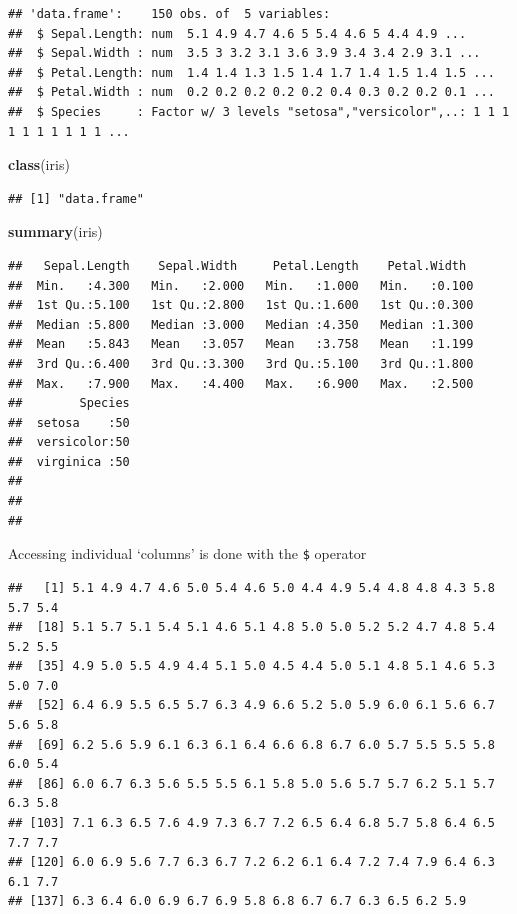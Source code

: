 \documentclass[]{book}
\newenvironment{Shaded}{\begin{snugshade}}{\end{snugshade}}
\newcommand{\KeywordTok}[1]{\textcolor[rgb]{0.13,0.29,0.53}{\textbf{#1}}}
\newcommand{\OperatorTok}[1]{\textcolor[rgb]{0.81,0.36,0.00}{\textbf{#1}}}
\newcommand{\NormalTok}[1]{#1}
\theoremstyle{definition}
\theoremstyle{definition}
\theoremstyle{definition}
\theoremstyle{remark}
\begin{document}
\begin{verbatim}
## 'data.frame':    150 obs. of  5 variables:
##  $ Sepal.Length: num  5.1 4.9 4.7 4.6 5 5.4 4.6 5 4.4 4.9 ...
##  $ Sepal.Width : num  3.5 3 3.2 3.1 3.6 3.9 3.4 3.4 2.9 3.1 ...
##  $ Petal.Length: num  1.4 1.4 1.3 1.5 1.4 1.7 1.4 1.5 1.4 1.5 ...
##  $ Petal.Width : num  0.2 0.2 0.2 0.2 0.2 0.4 0.3 0.2 0.2 0.1 ...
##  $ Species     : Factor w/ 3 levels "setosa","versicolor",..: 1 1 1 1 1 1 1 1 1 1 ...
\end{verbatim}

\begin{Shaded}
\begin{Highlighting}[]
\KeywordTok{class}\NormalTok{(iris)}
\end{Highlighting}
\end{Shaded}

\begin{verbatim}
## [1] "data.frame"
\end{verbatim}

\begin{Shaded}
\begin{Highlighting}[]
\KeywordTok{summary}\NormalTok{(iris)}
\end{Highlighting}
\end{Shaded}

\begin{verbatim}
##   Sepal.Length    Sepal.Width     Petal.Length    Petal.Width   
##  Min.   :4.300   Min.   :2.000   Min.   :1.000   Min.   :0.100  
##  1st Qu.:5.100   1st Qu.:2.800   1st Qu.:1.600   1st Qu.:0.300  
##  Median :5.800   Median :3.000   Median :4.350   Median :1.300  
##  Mean   :5.843   Mean   :3.057   Mean   :3.758   Mean   :1.199  
##  3rd Qu.:6.400   3rd Qu.:3.300   3rd Qu.:5.100   3rd Qu.:1.800  
##  Max.   :7.900   Max.   :4.400   Max.   :6.900   Max.   :2.500  
##        Species  
##  setosa    :50  
##  versicolor:50  
##  virginica :50  
##                 
##                 
## 
\end{verbatim}

Accessing individual `columns' is done with the \texttt{\$} operator

\begin{Shaded}
\end{Shaded}

\begin{verbatim}
##   [1] 5.1 4.9 4.7 4.6 5.0 5.4 4.6 5.0 4.4 4.9 5.4 4.8 4.8 4.3 5.8 5.7 5.4
##  [18] 5.1 5.7 5.1 5.4 5.1 4.6 5.1 4.8 5.0 5.0 5.2 5.2 4.7 4.8 5.4 5.2 5.5
##  [35] 4.9 5.0 5.5 4.9 4.4 5.1 5.0 4.5 4.4 5.0 5.1 4.8 5.1 4.6 5.3 5.0 7.0
##  [52] 6.4 6.9 5.5 6.5 5.7 6.3 4.9 6.6 5.2 5.0 5.9 6.0 6.1 5.6 6.7 5.6 5.8
##  [69] 6.2 5.6 5.9 6.1 6.3 6.1 6.4 6.6 6.8 6.7 6.0 5.7 5.5 5.5 5.8 6.0 5.4
##  [86] 6.0 6.7 6.3 5.6 5.5 5.5 6.1 5.8 5.0 5.6 5.7 5.7 6.2 5.1 5.7 6.3 5.8
## [103] 7.1 6.3 6.5 7.6 4.9 7.3 6.7 7.2 6.5 6.4 6.8 5.7 5.8 6.4 6.5 7.7 7.7
## [120] 6.0 6.9 5.6 7.7 6.3 6.7 7.2 6.2 6.1 6.4 7.2 7.4 7.9 6.4 6.3 6.1 7.7
## [137] 6.3 6.4 6.0 6.9 6.7 6.9 5.8 6.8 6.7 6.7 6.3 6.5 6.2 5.9
\end{verbatim}
\end{document}
